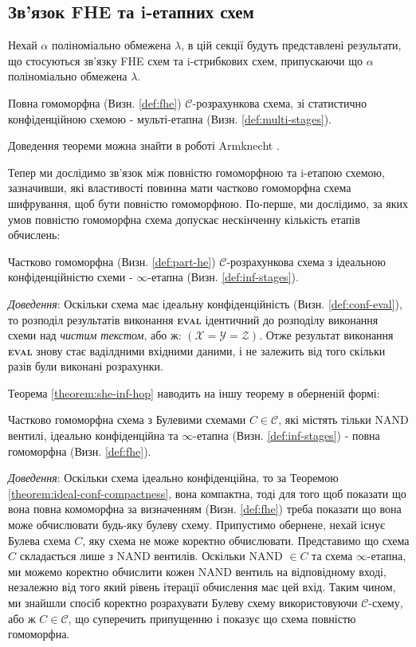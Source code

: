 \subsection{Зв'язок FHE та i-етапних схем}
Нехай \(\alpha\) поліноміально обмежена \(\lambda\), в цій секції будуть представлені
результати, що стосуються зв'язку FHE схем та i-стрибкових схем, припускаючи що \(\alpha\)
поліноміально обмежена \(\lambda\).

\begin{theorem}
    Повна гомоморфна (Визн. \ref{def:fhe}) \(\mathcal{C}\)-розрахункова схема, зі статистично конфіденційною
    схемою - мульті-етапна (Визн. \ref{def:multi-stages}).
\end{theorem}
Доведення теореми можна знайти в роботі Armknecht \cite{cryptoeprint:2015/1192}.

Тепер ми дослідимо зв'язок між повністю гомоморфною та i-етапою схемою, зазначивши, які
властивості повинна мати частково гомоморфна схема шифрування, щоб бути повністю
гомоморфною. По-перше, ми дослідимо, за яких умов повністю гомоморфна схема допускає
нескінченну кількість етапів обчислень:

\begin{theorem}
    \label{theorem:she-inf-hop}
    Частково гомоморфна (Визн. \ref{def:part-he}) \(\mathcal{C}\)-розрахункова схема з
    ідеальною конфіденційністю схеми - \(\infty\)-етапна (Визн. \ref{def:inf-stages}).
\end{theorem}

\emph{Доведення}: Оскільки схема має ідеальну конфіденційність (Визн. \ref{def:conf-eval}),
то розподіл результатів виконання \textsc{\textbf{eval}} ідентичний до розподілу виконання
схеми над \emph{чистим текстом}, або ж: \((\mathcal{X} = \mathcal{Y} = \mathcal{Z})\). Отже
результат виконання \textsc{\textbf{eval}} знову стає ваділдними вхідними даними, і не
залежить від того скільки разів були виконані розрахунки.

Теорема \ref{theorem:she-inf-hop} наводить на іншу теорему в оберненій формі:

\begin{theorem}
    Частково гомоморфна схема з Булевими схемами \(C \in \mathcal{C}\), які містять
    тільки NAND вентилі, ідеально конфіденційна та \(\infty\)-етапна (Визн. \ref{def:inf-stages}) - повна гомоморфна (Визн. \ref{def:fhe}).
\end{theorem}

\emph{Доведення}: Оскільки схема ідеально конфіденційна, то за Теоремою \ref{theorem:ideal-conf-compactness}, вона компактна, тоді для того щоб показати що вона повна комоморфна за
визначенням (Визн. \ref{def:fhe}) треба показати що вона може обчислювати будь-яку
булеву схему. Припустимо обернене, нехай існує Булева схема \(C\), яку схема не може
коректно обчислювати. Представимо що схема \(C\) складається лише з NAND вентилів.
Оскільки NAND \(\in C\) та схема \(\infty\)-етапна, ми можемо коректно обчислити
кожен NAND вентиль на відповідному вході, незалежно від того який рівень ітерації
обчислення має цей вхід. Таким чином, ми знайшли спосіб коректно розрахувати Булеву схему
використовуючи \(\mathcal{C}\)-схему, або ж \(C \in \mathcal{C}\), що суперечить припущенню
і показує що схема повністю гомоморфна.

